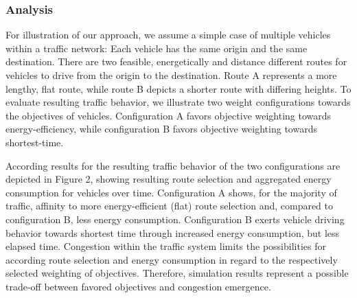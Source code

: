 \documentclass[conference]{../cls/IEEEtran}
\begin{document}
\subsubsection{Analysis}

For illustration of our approach, we assume a simple case of multiple vehicles
within a traffic network: Each vehicle has the same origin and the same
destination. There are two feasible, energetically and distance different
routes for vehicles to drive from the origin to the destination. Route A
represents a more lengthy, flat route, while route B depicts a shorter route
with differing heights. To evaluate resulting traffic behavior, we
illustrate two weight configurations towards the objectives of vehicles.
Configuration A favors objective weighting towards energy-efficiency, while
configuration B favors objective weighting towards shortest-time.

According results for the resulting traffic behavior of the two configurations
are depicted in Figure 2, showing resulting route selection and aggregated
energy consumption for vehicles over time. Configuration A shows, for the
majority of traffic, affinity to more energy-efficient (flat) route selection
and, compared to configuration B, less energy consumption. Configuration B
exerts vehicle driving behavior towards shortest time through increased energy
consumption, but less elapsed time. Congestion within the
traffic system limits the possibilities for according route selection and
energy consumption in regard to the respectively selected weighting of
objectives. Therefore, simulation results represent a
possible trade-off between favored objectives and congestion emergence.
\end{document}

